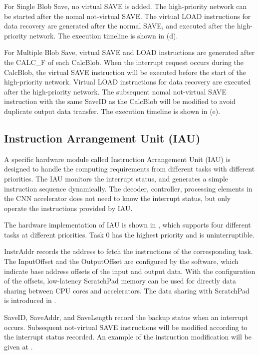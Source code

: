 For Single Blob Save, no virtual SAVE is added. The high-priority network can be started after the nomal not-virtual SAVE. The virtual LOAD instructions for data recovery are generated after the normal SAVE, and executed after the high-priority network. The execution timeline is shown in (d).

For Multiple Blob Save, virtual SAVE and LOAD instructions are generated after the CALC\_F of each CalcBlob. When the interrupt request occurs during the CalcBlob, the virtual SAVE instruction will be executed before the start of the high-priority network. Virtual LOAD instructions for data recovery are executed after the high-priority network. The subsequent nomal not-virtual SAVE instruction with the same SaveID as the CalcBlob will be modified to avoid duplicate output data transfer. The execution timeline is shown in (e).








\subsection{ Instruction Arrangement Unit (IAU) }

A specific hardware module called Instruction Arrangement Unit (IAU) is designed to handle the computing requirements from different tasks with different priorities. The IAU monitors the interrupt status, and generates a simple instruction sequence dynamically. The decoder, controller, processing elements in the CNN accelerator does not need to know the interrupt status, but only operate the instructions provided by IAU.

The hardware implementation of IAU is shown in , which supports four different tasks at different priorities. Task 0 has the highest priority and is uninterruptible. 

InstrAddr records the address to fetch the instructions of the corresponding task. The InputOffset and the OutputOffset are configured by the software, which indicate base address offsets of the input and output data. With the configuration of the offsets, low-latency ScratchPad memory \cite{Banakar2002Scratchpad} can be used for directly data sharing between CPU cores and accelerators. The data sharing with ScratchPad \cite{Banakar2002Scratchpad} is introduced in .


SaveID, SaveAddr, and SaveLength record the backup status when an interrupt occurs. 
Subsequent not-virtual SAVE instructions will be modified according to the interrupt status recorded.
An example of the instruction modification will be given at .


